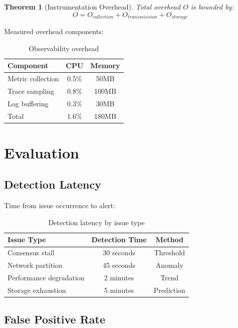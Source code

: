 \documentclass[11pt,a4paper]{article}
\newtheorem{theorem}{Theorem}
\begin{document}
\begin{theorem}[Instrumentation Overhead]
Total overhead $O$ is bounded by:
\[
O = O_{collection} + O_{transmission} + O_{storage}
\]
\end{theorem}

Measured overhead components:

\begin{table}[h]
\centering
\begin{tabular}{lcc}
\hline
\textbf{Component} & \textbf{CPU} & \textbf{Memory} \\
\hline
Metric collection & 0.5\% & 50MB \\
Trace sampling & 0.8\% & 100MB \\
Log buffering & 0.3\% & 30MB \\
\hline
Total & 1.6\% & 180MB \\
\hline
\end{tabular}
\caption{Observability overhead}
\end{table}

\section{Evaluation}

\subsection{Detection Latency}

Time from issue occurrence to alert:

\begin{table}[h]
\centering
\begin{tabular}{lcc}
\hline
\textbf{Issue Type} & \textbf{Detection Time} & \textbf{Method} \\
\hline
Consensus stall & 30 seconds & Threshold \\
Network partition & 45 seconds & Anomaly \\
Performance degradation & 2 minutes & Trend \\
Storage exhaustion & 5 minutes & Prediction \\
\hline
\end{tabular}
\caption{Detection latency by issue type}
\end{table}

\subsection{False Positive Rate}
\end{document}
